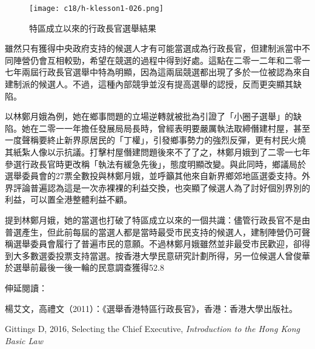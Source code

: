 \begin{figure}[htbp]
    \centering
    \texttt{[image: c18/h-klesson1-026.png]}
    \caption{特區成立以來的行政長官選舉結果} 
\end{figure}

雖然只有獲得中央政府支持的候選人才有可能當選成為行政長官，但建制派當中不同陣營仍會互相較勁，希望在競選的過程中得到好處。這點在二零一二年和二零一七年兩屆行政長官選舉中特為明顯，因為這兩屆競選都出現了多於一位被認為來自建制派的候選人。不過，這種內部競爭並沒有提高選舉的認授，反而更突顯其缺陷。

以林鄭月娥為例，她在鄉事問題的立場逆轉就被批為引證了「小圈子選舉」的缺陷。她在二零一一年擔任發展局局長時，曾經表明要嚴厲執法取締僭建村屋，甚至一度聲稱要終止新界原居民的「丁權」，引發鄉事勢力的強烈反彈，更有村民火燒其紙紮人像以示抗議。打擊村屋僭建問題後來不了了之，林鄭月娥到了二零一七年參選行政長官時更改稱「執法有緩急先後」，態度明顯改變。與此同時，鄉議局於選舉委員會的27票全數投與林鄭月娥，並呼籲其他來自新界鄉郊地區選委支持。外界評論普遍認為這是一次赤裸裸的利益交換，也突顯了候選人為了討好個別界別的利益，可以置全港整體利益不顧。

提到林鄭月娥，她的當選也打破了特區成立以來的一個共識：儘管行政長官不是由普選產生，但此前每屆的當選人都是當時最受市民支持的候選人，建制陣營仍可聲稱選舉委員會履行了普遍市民的意願。不過林鄭月娥雖然並非最受市民歡迎，卻得到大多數選委投票支持當選。按香港大學民意研究計劃所得，另一位候選人曾俊華於選舉前最後一後一輪的民意調查獲得52.8%



伸延閱讀：

楊艾文，高禮文（2011）：《選舉香港特區行政長官》，香港：香港大學出版社。

Gittings D, 2016, Selecting the Chief Executive, \textit{Introduction to the Hong Kong Basic Law}